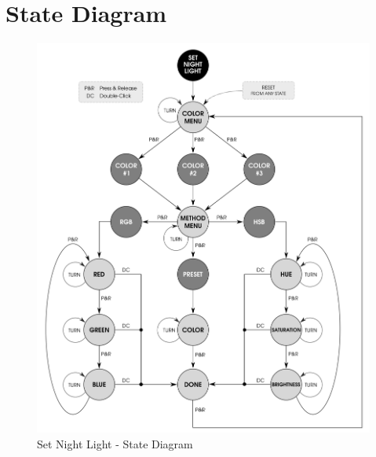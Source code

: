\section{State Diagram}

\begin{figure}[H]
\centering
  \includegraphics{images/set_night_light_state_diagram.png}
\caption{Set Night Light - State Diagram}
\end{figure}
